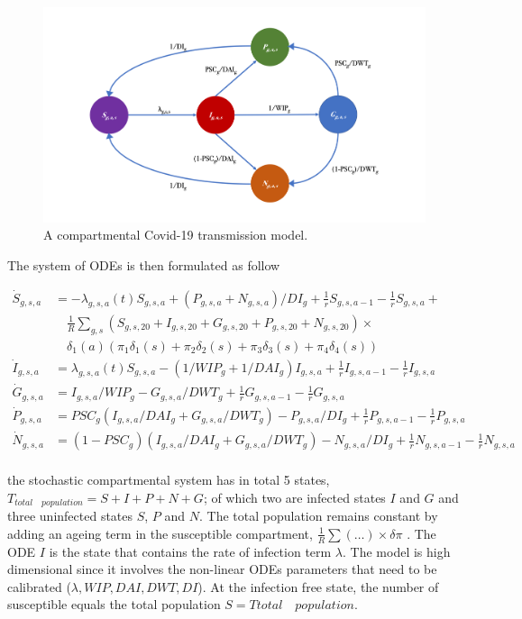 \documentclass[12pt]{article}
\begin{document}
\begin{figure}[h!]
\centering
\includegraphics[width=1\textwidth]{COVIDb}
\caption{A compartmental Covid-19 transmission model.}
\label{fig:model}
\end{figure}

The system of ODEs is then formulated as follow

\begin{align*}
\dot{S}_{g,s,a} & =  -\lambda_{g,s,a}(t)S_{g,s,a} + (P_{g,s,a} + N_{g,s,a})/DI_g + \frac{1}{r}S_{g,s,a-1} - \frac{1}{r}S_{g,s,a} + \\
& \quad \frac{1}{R}\sum_{g,s}(S_{g,s,20} + I_{g,s,20} + G_{g,s,20} + P_{g,s,20} + N_{g,s,20}) \times \\
& \quad \delta_1(a)(\pi_1\delta_1(s) + \pi_2\delta_2(s) + \pi_3\delta_3(s) + \pi_4\delta_4(s)) \\ 
\dot{I}_{g,s,a}  & =  \lambda_{g,s,a}(t)S_{g,s,a} - (1/WIP_g + 1/DAI_g)I_{g,s,a} + \frac{1}{r}I_{g,s,a-1}-\frac{1}{r}I_{g,s,a} \\
\dot{G}_{g,s,a}  & =  I_{g,s,a}/WIP_g - G_{g,s,a}/DWT_g + \frac{1}{r}G_{g,s,a-1} - \frac{1}{r}G_{g,s,a} \\ 
\dot{P}_{g,s,a}  & =  PSC_g(I_{g,s,a}/DAI_g + G_{g,s,a}/DWT_g) - P_{g,s,a}/DI_g + \frac{1}{r}P_{g,s,a-1} - \frac{1}{r}P_{g,s,a} \\
\dot{N}_{g,s,a}  & =  (1-PSC_g)(I_{g,s,a}/DAI_g + G_{g,s,a}/DWT_g) - N_{g,s,a}/DI_g + \frac{1}{r}N_{g,s,a-1}-\frac{1}{r}N_{g,s,a} \\
\end{align*}

the stochastic compartmental system has in total 5 states, $T_{total \quad population} = S + I + P + N + G$; of which two are infected states $I$ and $G$ and three uninfected states $S$, $P$ and $N$. The total population remains constant by adding an ageing term in the susceptible compartment, $\frac{1}{R}\sum(\dots)\times\delta\pi$ \cite[p.7]{Gareth:2013}. The ODE $I$ is the state that contains the rate of infection term $\lambda$. The model is high dimensional since it involves the non-linear ODEs parameters that need to be calibrated ($\lambda, WIP, DAI, DWT, DI$). At the infection free state, the number of susceptible equals the total population $S=T{total \quad population}$. 
\end{document}
